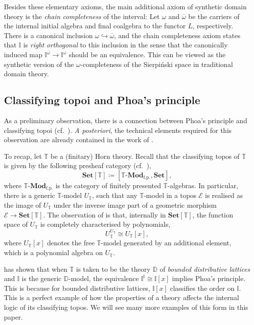 \documentclass[a4paper,12pt]{amsart}
\theoremstyle{definition}
\newcommand{\mc}[1]{\mathcal{#1}}
\newcommand{\mb}[1]{\mathbf{#1}}
\newcommand{\mbb}[1]{\mathbb{#1}}
\newcommand{\T}{\mbb T}
\newcommand{\I}{\mbb I}
\newcommand{\mr}[1]{\mathrm{#1}}
\newcommand{\Set}{\mb{Set}}
\newcommand{\ov}[1]{\overline{#1}}
\newcommand{\hook}{\hookrightarrow}
\newcommand{\fp}{_{\mr{f.p.}}}
\newcommand{\mmod}[1]{#1\text{-}\mathbf{Mod}}
\begin{document}
Besides these elementary axioms, the main additional axiom of synthetic domain theory is the \emph{chain completeness} of the interval: Let $\omega$ and $\ov\omega$ be the carriers of the internal initial algebra and final coalgebra to the functor $L$, respectively. 
There is a canonical inclusion $\omega \hook \ov\omega$, and the chain completeness axiom states that $\I$ is \emph{right orthogonal} to this inclusion in the sense that the canonically induced map $\I^{\ov\omega} \to \I^{\omega}$ should be an equivalence. This can be viewed as the synthetic version of the $\omega$-completeness of the Sierpi\'nski space in traditional domain theory.

\subsection{Classifying topoi and Phoa's principle}\label{subsec:classtopphoa}

As a preliminary observation, there is a connection between Phoa's principle and classifying topoi (cf.~\cite[Lem 3.8]{gratzer2024directed}).
\emph{A posteriori}, the technical elements required for this observation are already contained in the work of \citet{RN879}.

To recap, let $\T$ be a (finitary) Horn theory. Recall that the classifying topos of $\T$ is given by the following presheaf category (cf.~\cite[D3.1]{johnstone2002sketches}),
\[ \Set[\T] \coloneq [\mmod\T\fp,\Set], \]
where $\mmod\T\fp$ is the category of finitely presented $\T$-algebras. In particular, there is a generic $\T$-model $U_\T$, such that any $\T$-model in a topos $\mc E$ is realised as the image of $U_\T$ under the inverse image part of a geometric morphism $\mc E \to \Set[\T]$. The observation of \citet{RN879} is that, internally in $\Set[\T]$, the function space of $U_\T$ is completely characterised by polynomials,
\[ U_\T^{U_\T} \cong U_\T[x], \]
where $U_\T[x]$ denotes the free $\T$-model generated by an additional element, which is a  polynomial algebra on $U_\T$.

\citet{gratzer2024directed} has shown that when $\T$ is taken to be the theory $\mbb D$ of \emph{bounded distributive lattices} and $\I$ is the generic $\mbb D$-model, the equivalence $\I^\I \cong \I[x]$ implies Phoa's principle. This is because for bounded distributive lattices, $\I[x]$ classifies the order on $\I$. This is a perfect example of how the properties of a theory affects the internal logic of its classifying topos. We will see many more examples of this form in this paper.
\end{document}
